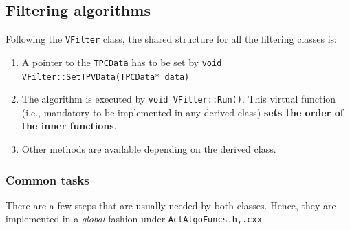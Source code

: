 \documentclass[11pt, a4paper, english]{article}
\begin{document}
\subsection{Filtering algorithms}
Following the \lstinline|VFilter| class, the shared structure for all the filtering classes is:
\begin{enumerate}
	\item A pointer to the \lstinline|TPCData| has to be set by \lstinline|void VFilter::SetTPVData(TPCData* data)|
	\item The algorithm is executed by \lstinline|void VFilter::Run()|. This virtual function (i.e., mandatory to be implemented in any derived class) \textbf{sets the order of the inner functions}.
	\item Other methods are available depending on the derived class.
\end{enumerate}

\subsubsection{Common tasks}
There are a few steps that are usually needed by both classes. Hence, they are implemented in a \textit{global} fashion under \lstinline|ActAlgoFuncs.h,.cxx|.
\end{document}
